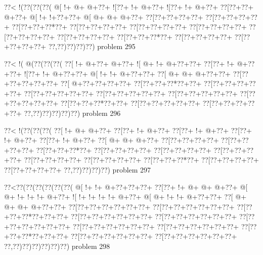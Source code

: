 \vbox{\vbox{\goo
\0??<\- !(\0??(\0??(\0??(
\- @[\- !+\- @+\- @+\0??+
\- ![\0??+\- !+\- @+\0??+
\- ![\0??+\- !+\- @+\0??+
\0??[\0??+\0??+\- @+\0??+
\- @[\- !+\- !+\0??+\0??+
\- @[\- @+\- @+\- @+\0??+
\0??[\0??+\0??+\0??+\0??+
\0??[\0??+\0??+\0??+\0??+
\0??[\0??+\0??+\0??*\0??+
\0??[\0??+\0??+\0??+\0??+
\0??[\0??+\0??+\0??+\0??+
\0??[\0??+\0??+\0??+\0??+
\0??[\0??+\0??+\0??+\0??+
\0??[\0??+\0??+\0??+\0??+
\0??[\0??+\0??+\0??*\0??+
\0??[\0??+\0??+\0??+\0??+
\0??[\0??+\0??+\0??+\0??+
\0??,\0??)\0??)\0??)\0??)
}
\hfil problem 295\hfil\break
}

\vbox{\vbox{\goo
\0??<\- !(\- @(\0??(\0??(\0??(
\0??[\- !+\- @+\0??+\- @+\0??+
\- ![\- @+\- !+\- @+\0??+\0??+
\0??[\0??+\- !+\- @+\0??+\0??+
\- ![\0??+\- !+\- @+\0??+\0??+
\- @[\- !+\- !+\- @+\0??+\0??+
\0??[\- @+\- @+\- @+\0??+\0??+
\0??[\0??+\0??+\0??+\0??+\0??+
\0??[\- @+\0??+\0??+\0??+\0??+
\0??[\0??+\0??+\0??*\0??+\0??+
\0??[\0??+\0??+\0??+\0??+\0??+
\0??[\0??+\0??+\0??+\0??+\0??+
\0??[\0??+\0??+\0??+\0??+\0??+
\0??[\0??+\0??+\0??+\0??+\0??+
\0??[\0??+\0??+\0??+\0??+\0??+
\0??[\0??+\0??+\0??*\0??+\0??+
\0??[\0??+\0??+\0??+\0??+\0??+
\0??[\0??+\0??+\0??+\0??+\0??+
\0??,\0??)\0??)\0??)\0??)\0??)
}
\hfil problem 296\hfil\break
}

\vbox{\vbox{\goo
\0??<\- !(\0??(\0??(\0??(
\0??[\- !+\- @+\- @+\0??+
\0??[\0??+\- !+\- @+\0??+
\0??[\0??+\- !+\- @+\0??+
\0??[\0??+\- !+\- @+\0??+
\0??[\0??+\- !+\- @+\0??+
\0??[\- @+\- @+\- @+\0??+
\0??[\0??+\0??+\0??+\0??+
\0??[\0??+\0??+\0??+\0??+
\0??[\0??+\0??+\0??*\0??+
\0??[\0??+\0??+\0??+\0??+
\0??[\0??+\0??+\0??+\0??+
\0??[\0??+\0??+\0??+\0??+
\0??[\0??+\0??+\0??+\0??+
\0??[\0??+\0??+\0??+\0??+
\0??[\0??+\0??+\0??*\0??+
\0??[\0??+\0??+\0??+\0??+
\0??[\0??+\0??+\0??+\0??+
\0??,\0??)\0??)\0??)\0??)
}
\hfil problem 297\hfil\break
}

\vbox{\vbox{\goo
\0??<\0??(\0??(\0??(\0??(\0??(\0??(
\- @[\- !+\- !+\- @+\0??+\0??+\0??+
\0??[\0??+\- !+\- @+\- @+\- @+\0??+
\- @[\- @+\- !+\- !+\- !+\- @+\0??+
\- ![\- !+\- !+\- !+\- !+\- @+\0??+
\- @[\- @+\- !+\- !+\- @+\0??+\0??+
\0??[\- @+\- @+\- @+\- @+\0??+\0??+
\0??[\0??+\0??+\0??+\0??+\0??+\0??+
\0??[\0??+\0??+\0??+\0??+\0??+\0??+
\0??[\0??+\0??+\0??*\0??+\0??+\0??+
\0??[\0??+\0??+\0??+\0??+\0??+\0??+
\0??[\0??+\0??+\0??+\0??+\0??+\0??+
\0??[\0??+\0??+\0??+\0??+\0??+\0??+
\0??[\0??+\0??+\0??+\0??+\0??+\0??+
\0??[\0??+\0??+\0??+\0??+\0??+\0??+
\0??[\0??+\0??+\0??*\0??+\0??+\0??+
\0??[\0??+\0??+\0??+\0??+\0??+\0??+
\0??[\0??+\0??+\0??+\0??+\0??+\0??+
\0??,\0??)\0??)\0??)\0??)\0??)\0??)
}
\hfil problem 298\hfil\break
}

